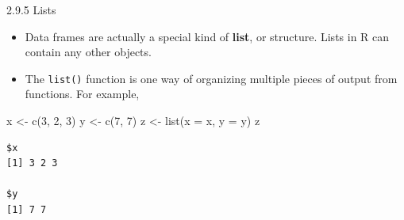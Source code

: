 \documentclass[
  9pt,
  a4paper,
  ignorenonframetext,
  notheorems]{beamer}
\newenvironment{Shaded}{\begin{snugshade}}{\end{snugshade}}
\newcommand{\AttributeTok}[1]{\textcolor[rgb]{0.40,0.45,0.13}{#1}}
\newcommand{\DecValTok}[1]{\textcolor[rgb]{0.68,0.00,0.00}{#1}}
\newcommand{\FunctionTok}[1]{\textcolor[rgb]{0.28,0.35,0.67}{#1}}
\newcommand{\NormalTok}[1]{\textcolor[rgb]{0.00,0.23,0.31}{#1}}
\newcommand{\OtherTok}[1]{\textcolor[rgb]{0.00,0.23,0.31}{#1}}
\providecommand{\tightlist}{%
  \setlength{\itemsep}{0pt}\setlength{\parskip}{0pt}}\usepackage{longtable,booktabs,array}
\begin{document}
\begin{frame}[fragile]
\begin{block}{2.9.5 Lists}
\protect\hypertarget{lists}{}
\begin{itemize}
\tightlist
\item
  Data frames are actually a special kind of \textbf{list}, or
  structure. Lists in R can contain any other objects.
\end{itemize}

\begin{itemize}
\tightlist
\item
  The \texttt{list()} function is one way of organizing multiple pieces
  of output from functions. For example,
\end{itemize}

\begin{Shaded}
\begin{Highlighting}[]
\NormalTok{x }\OtherTok{\textless{}{-}} \FunctionTok{c}\NormalTok{(}\DecValTok{3}\NormalTok{, }\DecValTok{2}\NormalTok{, }\DecValTok{3}\NormalTok{)}
\NormalTok{y }\OtherTok{\textless{}{-}} \FunctionTok{c}\NormalTok{(}\DecValTok{7}\NormalTok{, }\DecValTok{7}\NormalTok{)}
\NormalTok{z }\OtherTok{\textless{}{-}} \FunctionTok{list}\NormalTok{(}\AttributeTok{x =}\NormalTok{ x, }\AttributeTok{y =}\NormalTok{ y) }
\NormalTok{z}
\end{Highlighting}
\end{Shaded}

\begin{verbatim}
$x
[1] 3 2 3

$y
[1] 7 7
\end{verbatim}
\end{block}
\end{frame}
\end{document}

